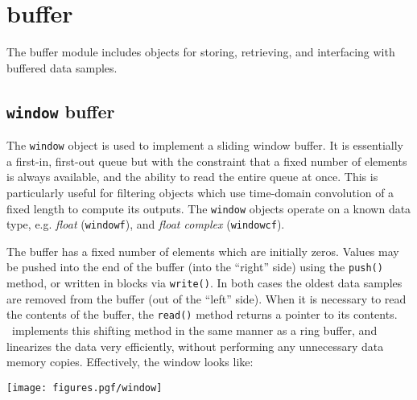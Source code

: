 % 
%

\newpage
\section{buffer}
\label{module:buffer}
The buffer module includes objects for storing, retrieving, and
interfacing with buffered data samples.


\subsection{{\tt window} buffer}
\label{module:buffer:window}
The {\tt window} object is used to implement a sliding window buffer.
It is essentially a first-in, first-out queue but with the constraint that a
fixed number of elements is always available, and the ability to read the
entire queue at once.
This is particularly useful for filtering objects which use time-domain
convolution of a fixed length to compute its outputs.
The {\tt window} objects operate on a known data type, e.g.
{\it float} ({\tt windowf}), and
{\it float complex} ({\tt windowcf}).

The buffer has a fixed number of elements which are initially zeros.
Values may be pushed into the end of the buffer (into the ``right'' side)
using the {\tt push()} method, or written in blocks via {\tt write()}.
In both cases the oldest data samples are removed from the buffer (out of the
``left'' side).
When it is necessary to read the contents of the buffer, the {\tt read()}
method returns a pointer to its contents.
\liquid\ implements this shifting method in the same manner as a ring buffer,
and linearizes the data very efficiently, without performing any unnecessary
data memory copies.
Effectively, the window looks like:

\begin{centering}
\texttt{[image: figures.pgf/window]}
\end{centering}

